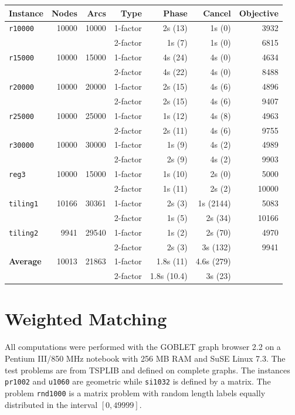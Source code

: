 \documentclass[a4paper,11pt,twoside]{book}
\begin{document}
\begin{multicols}{2}
\bigskip
\begin{center}
\small
\begin{tabular}{|lrrrrrr|}
\hline
{\bf Instance} & {\bf Nodes} & {\bf Arcs} & {\bf Type} & {\bf Phase} & {\bf Cancel} & {\bf Objective} \\
\hline
\hline
\verb/r10000/  & 10000 & 10000 & 1-factor & 2s (13)  & 1s (0)  &  3932 \\
               &       &       & 2-factor & 1s (7)   & 1s (0)  &  6815 \\
\verb/r15000/  & 10000 & 15000 & 1-factor & 4s (24)  & 4s (0)  &  4634 \\
               &       &       & 2-factor & 4s (22)  & 4s (0)  &  8488 \\
\verb/r20000/  & 10000 & 20000 & 1-factor & 2s (15)  & 4s (6)  &  4896 \\
               &       &       & 2-factor & 2s (15)  & 4s (6)  &  9407 \\
\verb/r25000/  & 10000 & 25000 & 1-factor & 1s (12)  & 4s (8)  &  4963 \\
               &       &       & 2-factor & 2s (11)  & 4s (6)  &  9755 \\
\verb/r30000/  & 10000 & 30000 & 1-factor & 1s (9)   & 4s (2)  &  4989 \\
               &       &       & 2-factor & 2s (9)   & 4s (2)  &  9903 \\
\verb/reg3/    & 10000 & 15000 & 1-factor & 1s (10)  & 2s (0)  &  5000 \\
               &       &       & 2-factor & 1s (11)  & 2s (2)  & 10000 \\
\verb/tiling1/ & 10166 & 30361 & 1-factor & 2s (3)   & 1s (2144) & 5083 \\
               &       &       & 2-factor & 1s (5)   & 2s (34) & 10166 \\
\verb/tiling2/ &  9941 & 29540 & 1-factor & 1s (2)   & 2s (70) &  4970 \\
               &       &       & 2-factor & 2s (3)   & 3s (132) & 9941 \\
\hline
{\bf Average}  & 10013 & 21863 & 1-factor & 1.8s (11)   & 4.6s (279) &  \\
               &       &       & 2-factor & 1.8s (10.4) & 3s  (23) &  \\
\hline
\end{tabular}
\end{center}



\section{Weighted Matching}
All computations were performed with the GOBLET graph browser 2.2 on a Pentium
III/850 MHz notebook with 256 MB RAM and SuSE Linux 7.3. The test problems are
from TSPLIB and defined on complete graphs. The instances \verb/pr1002/ and
\verb/u1060/ are geometric while \verb/si1032/ is defined by a matrix. The
problem \verb/rnd1000/ is a matrix problem with random length labels equally
distributed in the interval $[0,49999]$.


\end{multicols}
\end{document}
